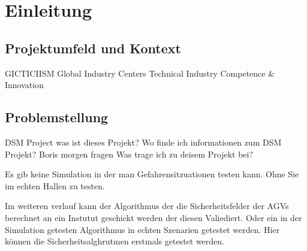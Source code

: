 \chapter{Einleitung}
\section{Projektumfeld und Kontext}%
GICTICIISM
Global Industry Centers Technical Industry Competence \& Innovation

\section{Problemstellung}
DSM Project was ist dieses Projekt?
Wo finde ich informationen zum DSM Projekt? Boris morgen fragen
Was trage ich zu deisem Projekt bei?

Es gib keine Simulation in der man Gefahrensitzuationen testen kann. Ohne Sie im echten Hallen zu testen.


Im weiteren verlauf kann der Algorithmus der die Sicherheitsfelder der AGVs berechnet an ein Instutut geschickt werden der diesen Valiediert. Oder ein in der Simulation getesten Algorithmus in echten Szenarien getestet werden.
Hier können die Sicherheitsalghrutmen erstmals getestet werden.



